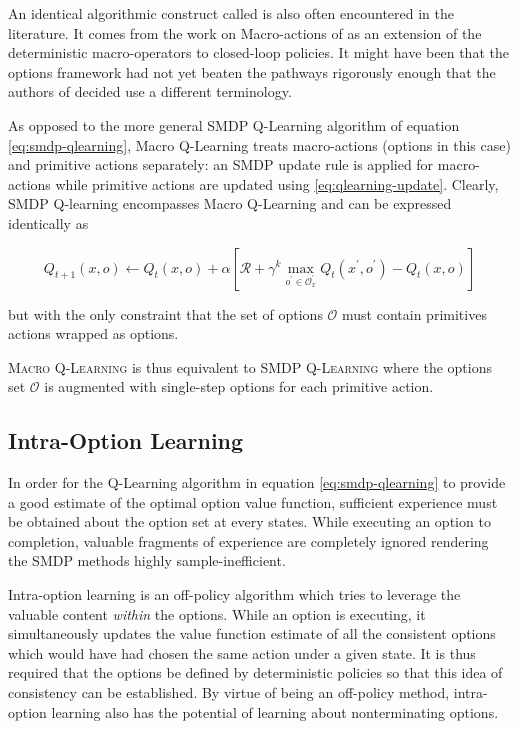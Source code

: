 \documentclass[12pt, oneside, extrafontsizes]{memoir}  %
\newcommand{\termidx}[1]{\index{#1}{\textbf{#1}}}
\theoremstyle{plain}
\theoremstyle{definition}
\begin{document}
An identical algorithmic construct called \termidx{Macro Q-learning} is also often
encountered in the literature. It comes from the work on Macro-actions of
\cite{Mcgovern1997} as an extension of the deterministic macro-operators
\cite{Korf1985} to closed-loop policies. It might have been that the options framework
had not yet beaten the pathways rigorously enough that the authors of
\cite{Mcgovern1997} decided use a different terminology. 

As opposed to the more general SMDP Q-Learning algorithm of equation
\ref{eq:smdp-qlearning}, Macro Q-Learning treats macro-actions (options in this case)
and primitive actions separately: an SMDP update rule is applied for macro-actions
while primitive actions are updated using \ref{eq:qlearning-update}. Clearly, SMDP Q-learning encompasses Macro Q-Learning and can be expressed identically as

\begin{equation}
Q_{t+1}(x, o) \leftarrow Q_{t}(x, o) + \alpha \left[ \mathcal{R} + \gamma^k
\max_{o^\prime \in \mathcal{O}_x^\prime} Q_{t}(x^\prime, o^\prime) -
Q_t(x, o) \right]
\end{equation}

but with the only constraint that the set of options $\mathcal{O}$ must contain
primitives actions wrapped as options.

\textsc{Macro Q-Learning} is thus equivalent to \textsc{SMDP Q-Learning} where the
options set $\mathcal{O}$ is augmented with single-step options for each primitive
action.

\subsection{Intra-Option Learning}

In order for the Q-Learning algorithm in equation \ref{eq:smdp-qlearning} to provide a
good estimate of the optimal option value function, sufficient experience must be
obtained about the option set at every states. While executing an option to completion,
valuable fragments of experience are completely ignored rendering the SMDP methods
highly sample-inefficient.

Intra-option learning is an off-policy algorithm which tries to leverage the valuable
content \textit{within} the options. While an option is executing, it simultaneously
updates the value function estimate of all the consistent options which would have had
chosen the same action under a given state. It is thus required that the options be
defined by deterministic policies so that this idea of consistency can be established. 
By virtue of being an off-policy method, intra-option learning also has the potential of
learning about nonterminating options. 
\end{document}
